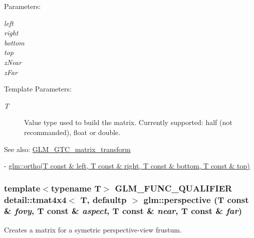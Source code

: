 \begin{Desc}
\item[Parameters:]
\begin{description}
\item[{\em left}]\item[{\em right}]\item[{\em bottom}]\item[{\em top}]\item[{\em zNear}]\item[{\em zFar}]\end{description}
\end{Desc}
\begin{Desc}
\item[Template Parameters:]
\begin{description}
\item[{\em T}]Value type used to build the matrix. Currently supported: half (not recommanded), float or double. \end{description}
\end{Desc}
\begin{Desc}
\item[See also:]\hyperlink{group__gtc__matrix__transform}{GLM\_\-GTC\_\-matrix\_\-transform} 

- \hyperlink{group__gtc__matrix__transform_gdab1dbf2b9ceda856624bafa09b3de07}{glm::ortho(T const \& left, T const \& right, T const \& bottom, T const \& top)} \end{Desc}
\hypertarget{group__gtc__matrix__transform_g6f705d60660ad2d4ef540ca0bb59273e}{
\subsubsection[perspective]{\setlength{\rightskip}{0pt plus 5cm}template$<$typename T$>$ GLM\_\-FUNC\_\-QUALIFIER detail::tmat4x4$<$ T, defaultp $>$ glm::perspective (T const \& {\em fovy}, \/  T const \& {\em aspect}, \/  T const \& {\em near}, \/  T const \& {\em far})}}
\label{group__gtc__matrix__transform_g6f705d60660ad2d4ef540ca0bb59273e}


Creates a matrix for a symetric perspective-view frustum.

